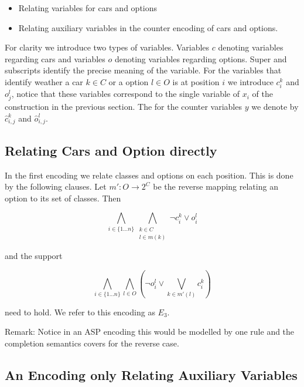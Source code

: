 \documentclass[]{llncs}
\begin{document}
\begin{itemize}
    \item Relating variables for cars and options
    \item Relating auxiliary variables in the counter encoding of cars
        and options. 
\end{itemize}

For clarity we introduce two types of variables. Variables $c$ denoting
variables regarding cars and variables $o$ denoting variables regarding
options. Super and subscripts identify the precise meaning of the
variable. For the variables that identify weather a car $k\in C$ or a
option $l\in O$ is at position $i$ we introduce $c^k_i$ and $o^l_j$,
notice that these variables correspond to the single variable of $x_i$
of the construction in the previous section. The for the counter
variables $y$ we denote by $\hat{c}^k_{i,j}$ and $\hat{o}^l_{i,j}$. 


\subsection{Relating Cars and Option directly}

In the first encoding we relate classes and options on each position.
This is done by the following clauses.  Let $m':O \rightarrow 2^C$ be
the reverse mapping relating an option to its set of classes. Then

\begin{equation}
    \bigwedge_{i\in \{1\ldots n\}} \bigwedge_{\substack{k \in C \\ l \in
    m(k)}} \neg c^k_{i} \vee o^l_{i}
\end{equation}

and the support

\begin{equation}
    \bigwedge_{i \in \{1\dots n\}} \bigwedge_{l\in O} \left(\neg o^l_{i} \vee
    \bigvee_{k \in m'(l)} c^k_{i}\right)
\end{equation}

need to hold. We refer to this encoding as $E_3$. 

Remark: Notice in an ASP encoding this would be modelled by one rule and
the completion semantics covers for the reverse case. 

\subsection{An Encoding only Relating Auxiliary Variables}
\end{document}
